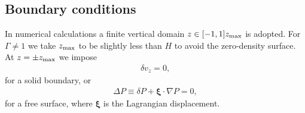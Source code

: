 \subsection{Boundary conditions}
In numerical calculations a finite vertical domain $z\in[-1,1]z_\mathrm{max}$
is adopted. For $\Gamma\neq1$ we take $z_\mathrm{max}$ to be slightly less than
$H$ to avoid the zero-density surface. At $z=\pm z_\mathrm{max}$ we impose
\begin{align}
  \delta v_z = 0,
\end{align}
for a solid boundary, or 
\begin{align}
  \Delta P \equiv \delta P + \bm{\xi}\cdot\nabla P= 0,  
\end{align}
for a free surface, where $\bm{\xi}$ is the Lagrangian
displacement.

